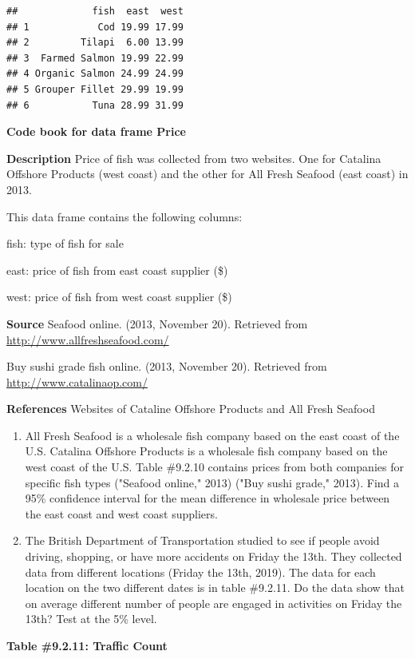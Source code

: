 \documentclass[]{book}
\begin{document}
\begin{verbatim}
##             fish  east  west
## 1            Cod 19.99 17.99
## 2         Tilapi  6.00 13.99
## 3  Farmed Salmon 19.99 22.99
## 4 Organic Salmon 24.99 24.99
## 5 Grouper Fillet 29.99 19.99
## 6           Tuna 28.99 31.99
\end{verbatim}

\textbf{Code book for data frame Price}

\textbf{Description}
Price of fish was collected from two websites. One for Catalina Offshore Products (west coast) and the other for All Fresh Seafood (east coast) in 2013.

This data frame contains the following columns:

fish: type of fish for sale

east: price of fish from east coast supplier (\$)

west: price of fish from west coast supplier (\$)

\textbf{Source}
Seafood online. (2013, November 20). Retrieved from \url{http://www.allfreshseafood.com/}

Buy sushi grade fish online. (2013, November 20). Retrieved from \url{http://www.catalinaop.com/}

\textbf{References}
Websites of Cataline Offshore Products and All Fresh Seafood

\begin{enumerate}
\def\labelenumi{\arabic{enumi}.}
\setcounter{enumi}{3}
\item
  All Fresh Seafood is a wholesale fish company based on the east coast of the U.S. Catalina Offshore Products is a wholesale fish company based on the west coast of the U.S. Table \#9.2.10 contains prices from both companies for specific fish types ("Seafood online," 2013) ("Buy sushi grade," 2013). Find a 95\% confidence interval for the mean difference in wholesale price between the east coast and west coast suppliers.
\item
  The British Department of Transportation studied to see if people avoid driving, shopping, or have more accidents on Friday the 13th. They collected data from different locations (Friday the 13th, 2019). The data for each location on the two different dates is in table \#9.2.11. Do the data show that on average different number of people are engaged in activities on Friday the 13th? Test at the 5\% level.
\end{enumerate}

\textbf{Table \#9.2.11: Traffic Count}
\end{document}
